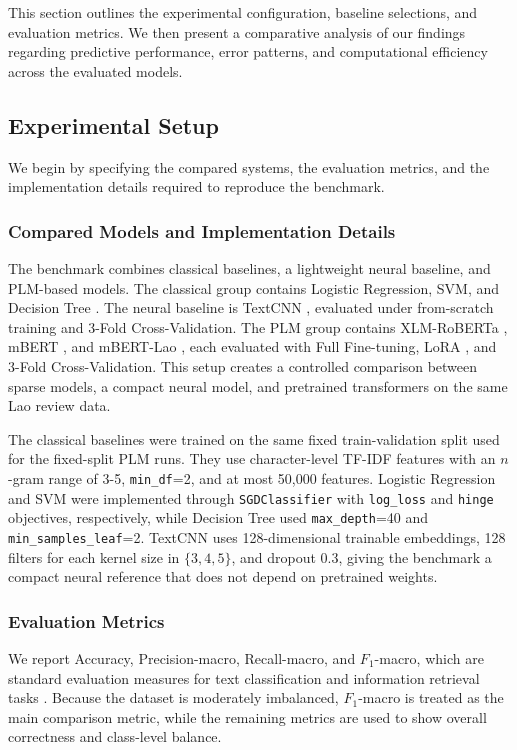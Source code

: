 \documentclass[conference, onecolumn]{IEEEtran}
\begin{document}
This section outlines the experimental configuration, baseline selections, and evaluation metrics. We then present a comparative analysis of our findings regarding predictive performance, error patterns, and computational efficiency across the evaluated models.

\subsection{Experimental Setup}
\label{subsec:experimental_setup}

We begin by specifying the compared systems, the evaluation metrics, and the implementation details required to reproduce the benchmark.

\subsubsection{Compared Models and Implementation Details}
The benchmark combines classical baselines, a lightweight neural baseline, and PLM-based models. The classical group contains Logistic Regression, SVM, and Decision Tree \cite{pedregosa2011scikit}. The neural baseline is TextCNN \cite{kim2014convolutional}, evaluated under from-scratch training and 3-Fold Cross-Validation. The PLM group contains XLM-RoBERTa \cite{conneau2020unsupervised}, mBERT \cite{devlin2019bert}, and mBERT-Lao \cite{lin2022laoplm}, each evaluated with Full Fine-tuning, LoRA \cite{hu2022lora}, and 3-Fold Cross-Validation. This setup creates a controlled comparison between sparse models, a compact neural model, and pretrained transformers on the same Lao review data.

The classical baselines were trained on the same fixed train-validation split used for the fixed-split PLM runs. They use character-level TF-IDF features with an $n$-gram range of 3-5, \texttt{min\_df}=2, and at most 50,000 features. Logistic Regression and SVM were implemented through \texttt{SGDClassifier} with \texttt{log\_loss} and \texttt{hinge} objectives, respectively, while Decision Tree used \texttt{max\_depth}=40 and \texttt{min\_samples\_leaf}=2. TextCNN uses 128-dimensional trainable embeddings, 128 filters for each kernel size in $\{3,4,5\}$, and dropout 0.3, giving the benchmark a compact neural reference that does not depend on pretrained weights.

\subsubsection{Evaluation Metrics}
We report Accuracy, Precision-macro, Recall-macro, and $F_1$-macro, which are standard evaluation measures for text classification and information retrieval tasks \cite{opitz2024closer,tan2023survey}. Because the dataset is moderately imbalanced, $F_1$-macro is treated as the main comparison metric, while the remaining metrics are used to show overall correctness and class-level balance.
\end{document}
